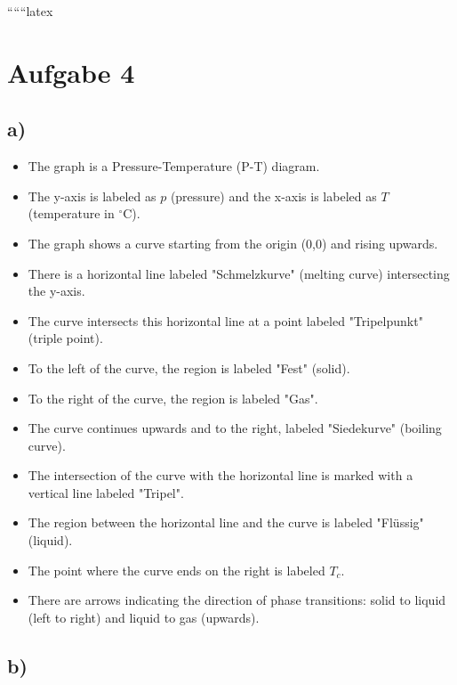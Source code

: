 
``````latex


\section*{Aufgabe 4}

\subsection*{a)}

\begin{itemize}
    \item The graph is a Pressure-Temperature (P-T) diagram.
    \item The y-axis is labeled as $p$ (pressure) and the x-axis is labeled as $T$ (temperature in $^\circ$C).
    \item The graph shows a curve starting from the origin (0,0) and rising upwards.
    \item There is a horizontal line labeled "Schmelzkurve" (melting curve) intersecting the y-axis.
    \item The curve intersects this horizontal line at a point labeled "Tripelpunkt" (triple point).
    \item To the left of the curve, the region is labeled "Fest" (solid).
    \item To the right of the curve, the region is labeled "Gas".
    \item The curve continues upwards and to the right, labeled "Siedekurve" (boiling curve).
    \item The intersection of the curve with the horizontal line is marked with a vertical line labeled "Tripel".
    \item The region between the horizontal line and the curve is labeled "Flüssig" (liquid).
    \item The point where the curve ends on the right is labeled $T_c$.
    \item There are arrows indicating the direction of phase transitions: solid to liquid (left to right) and liquid to gas (upwards).
\end{itemize}

\subsection*{b)}

